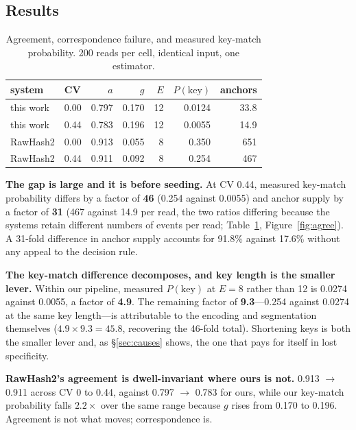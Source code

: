 \documentclass[sigconf,nonacm]{acmart}
\begin{document}
\subsection{Results}

\begin{table}[t]
\caption{Agreement, correspondence failure, and measured key-match probability. 200 reads per
cell, identical input, one estimator.}
\label{tab:agree}
\small
\begin{tabular}{llrrrrr}
\toprule
system & CV & $a$ & $g$ & $E$ & $P(\mathrm{key})$ & anchors \\
\midrule
this work & 0.00 & 0.797 & 0.170 & 12 & 0.0124 & 33.8 \\
this work & 0.44 & 0.783 & 0.196 & 12 & 0.0055 & 14.9 \\
RawHash2  & 0.00 & 0.913 & 0.055 & 8  & 0.350  & 651 \\
RawHash2  & 0.44 & 0.911 & 0.092 & 8  & 0.254  & 467 \\
\bottomrule
\end{tabular}
\end{table}

\textbf{The gap is large and it is before seeding.} At CV 0.44, measured key-match probability
differs by a factor of \textbf{46} (0.254 against 0.0055) and anchor supply by a factor of
\textbf{31} (467 against 14.9 per read, the two ratios differing because the systems retain
different numbers of events per read; Table~\ref{tab:agree}, Figure~\ref{fig:agree}). A 31-fold
difference in anchor supply accounts for 91.8\% against 17.6\% without any appeal to the
decision rule.

\textbf{The key-match difference decomposes, and key length is the smaller lever.} Within our
pipeline, measured $P(\mathrm{key})$ at $E = 8$ rather than 12 is 0.0274 against 0.0055, a
factor of \textbf{4.9}. The remaining factor of \textbf{9.3}---0.254 against 0.0274 at the same
key length---is attributable to the encoding and segmentation themselves
($4.9 \times 9.3 = 45.8$, recovering the 46-fold total). Shortening keys is both the smaller
lever and, as \S\ref{sec:causes} shows, the one that pays for itself in lost specificity.

\textbf{RawHash2's agreement is dwell-invariant where ours is not.} 0.913 $\rightarrow$ 0.911
across CV 0 to 0.44, against 0.797 $\rightarrow$ 0.783 for ours, while our key-match probability
falls $2.2\times$ over the same range because $g$ rises from 0.170 to 0.196. Agreement is not what
moves; correspondence is.
\end{document}
